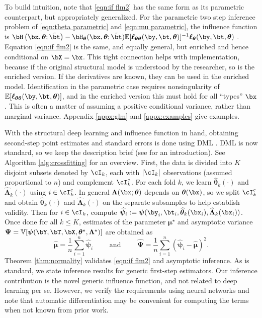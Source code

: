 \documentclass[12pt]{article}
\numberwithin{equation}{section}
\theoremstyle{definition}
\newcommand{\sumi}{\sum_{i=1}^n}
\newcommand{\E}{\mathbb{E}}
\newcommand{\V}{\mathbb{V}}
\newcommand{\bmu}{\boldsymbol{\mu}}
\newcommand{\btheta}{\boldsymbol{\theta}}
\newcommand{\bpsi}{\boldsymbol{\psi}}
\newcommand{\bPsi}{\boldsymbol{\Psi}}
\newcommand{\bL}{\boldsymbol{\Lambda}}
\newcommand{\bmtrue}{\bmu^\star}
\newcommand{\bttrue}{\btheta^\star}
\newcommand{\bLtrue}{\bL^\star}
\newcommand{\btstar}{\tilde{\bt}}
\newcommand{\bmhat}{\bm{\widehat{\mu}}}
\newcommand{\bthat}{\bm{\widehat{\theta}}}
\newcommand{\bPsihat}{\bm{\widehat{\Psi}}}
\newcommand{\bLhat}{\widehat{\bL}}
\begin{document}
To build intuition, note that \eqref{eqn:if flm2} has the same form as its parametric counterpart, but appropriately generalized. For the parametric two step inference problem of \eqref{eqn:theta parametric} and \eqref{eqn:mu parametric}, the influence function is $\bH\left(\bx, \btheta; \btstar\right)  - \bH_{\btheta}(\bx, \btheta; \btstar) \E [  \bm{\ell}_{\btheta\btheta}(\by, \bt, \btheta)]^{-1} \bm{\ell}_{\btheta}(\by, \bt, \btheta)$ \cite[\S 6]{Newey-McFadden1994_handbook}. Equation \eqref{eqn:if flm2} is the same, and equally general, but enriched and hence conditional on $\bX = \bx$. This tight connection helps with implementation, because if the original structural model is understood by the researcher, so is the enriched version. If the derivatives are known, they can be used in the enriched model. Identification in the parametric case requires nonsingularity of $\E [  \bm{\ell}_{\btheta\btheta}(\by, \bt, \btheta)]$, and in the enriched version this must hold for all ``types'' $\bx$. This is often a matter of assuming a positive conditional variance, rather than marginal variance. Appendix \ref{appx:glm} and \ref{appx:examples} give examples.



With the structural deep learning and influence function in hand, obtaining second-step point estimates and standard errors is done using DML \cite{Chernozhukov-etal2018_EJ}. DML is now standard, so we keep the description brief (see \cite{Ahrens-Chernozhukov-Hansen-Kozbur-Schaffer-Wiemann2026_JEL} for an introduction). See Algorithm \ref{alg:crossfitting} for an overview. First, the data is divided into $K$ disjoint subsets denoted by $\cI_k$, each with $|\cI_k|$ observations (assumed proportional to $n$) and complement $\cI_k^c$. For each fold $k$, we learn $\bthat_{k}(\cdot)$ and $\bLhat_{k}(\cdot)$ using $i \in \cI_k^c$. In general $\bL(\bx; \btheta)$ depends on $\btheta(\bx)$, so we split $\cI_k^c$ and obtain $\bthat_{k}(\cdot)$ and $\bLhat_{k}(\cdot)$ on the separate subsamples to help establish validity. Then for $i \in \cI_k$, compute $\widehat{\bpsi}_i := \bpsi(\by_i,\bt_i, \bthat_{k}(\bx_i), \bLhat_{k}(\bx_i))$. Once done for all $k \leq K$,  estimates of the parameter $\bmtrue$ and asymptotic variance $\bPsi = \V[\bpsi(\bY,\bT,\bX, \bttrue, \bLtrue)]$ are obtained as 
\begin{equation}
    \label{eqn:flm2 estimates}
    \bmhat = \frac{1}{n}\sumi \widehat{\bpsi}_i  		\qquad \text{ and } \qquad  		  \bPsihat = \frac{1}{n}\sumi   \left( \widehat{\bpsi}_i  - \bmhat \right)^2.
\end{equation}
Theorem \ref{thm:normality} validates \eqref{eqn:if flm2} and asymptotic inference. As is standard, we state inference results for generic first-step estimators. Our inference contribution is the novel generic influence function, and not related to deep learning per se. However, we verify the requirements using neural networks and note that automatic differentiation may be convenient for computing the terms when not known from prior work.
\end{document}
